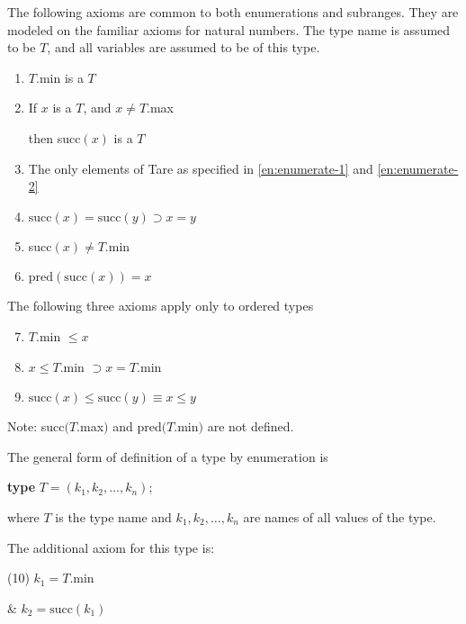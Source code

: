 The following axioms are common to both enumerations and subranges. They are modeled on the familiar axioms for natural numbers. The type name is assumed to be $T$, and all variables are assumed to be of this type.

\begin{enumerate}[leftmargin=2\parindent, label=(\arabic*)]
	\item \label{en:enumerate-1}
	$T$.min is a $T$
	
	\item \label{en:enumerate-2}
	If $x$ is a $T$, and $x\neq T$.max

	\quad then succ$(x)$ is a $T$

	\item The only elements of Tare as specified in \ref{en:enumerate-1} and \ref{en:enumerate-2}

	\item $\text{succ}(x) = \text{succ}(y) \supset x = y$

	\item succ$(x) \neq T$.min

	\item $\text{pred}(\text{succ}(x)) = x$
\end{enumerate}

\noindent
The following three axioms apply only to ordered types

\begin{enumerate}[leftmargin=2\parindent, label=(\arabic*)]
	\setcounter{enumi}{6}
	\item $T$.min $\leqslant x$

	\item $x \leqslant T$.min $\supset x = T$.min

	\item \label{en:enumerate-9}
	$\text{succ}(x) \leqslant \text{succ}(y) \equiv x \leqslant y$
\end{enumerate}

\noindent
Note: succ$(T$.max$)$ and pred$(T$.min$)$ are not defined.

The general form of definition of a type by enumeration is

\quad \textbf{type} $T = (k_1, k_2, \dots, k_n)$;

\noindent
where $T$ is the type name and $k_1, k_2 , \dots, k_n$ are names of all values of the type.

The additional axiom for this type is:

\tabto*{.9em}(10) $k_1 = T$.min

\tabto*{1.8em}\& $k_2 = \text{succ}(k_1)$

